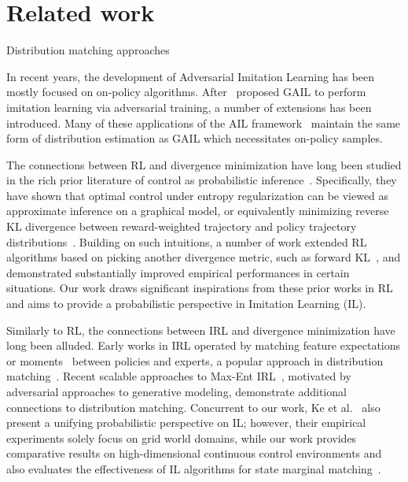 \section{Related work}
Distribution matching approaches 

In recent years, the development of Adversarial Imitation Learning has been mostly focused on on-policy algorithms. 
After~\citet{ho2016generative} proposed GAIL to perform imitation learning via adversarial training, a number of extensions has been introduced. 
Many of these applications of the AIL framework~\citep{li2017infogail,hausman2017multi,sun2019adversarial} maintain the same form of distribution estimation as GAIL which necessitates on-policy samples. 


The connections between RL and divergence minimization have long been studied in the rich prior literature of control as probabilistic inference~\citep{todorov2007linearly,toussaint2009robot,peters2010relative,kappen2012optimal}. 
Specifically, they have shown that optimal control under entropy regularization can be viewed as approximate inference on a graphical model, or equivalently minimizing reverse KL divergence between reward-weighted trajectory and policy trajectory distributions~\citep{kappen2012optimal,levine2018reinforcement}.
Building on such intuitions, a number of work extended RL algorithms based on picking another divergence metric, such as forward KL~\citep{peters2007reinforcement,norouzi2016reward}, and demonstrated substantially improved empirical performances in certain situations. 
Our work draws significant inspirations from these prior works in RL and aims to provide a probabilistic perspective in Imitation Learning (IL).


Similarly to RL, the connections between IRL and divergence minimization have long been alluded. 
Early works in IRL operated by matching feature expectations or moments~\citep{abbeel2004apprenticeship} between policies and experts, a popular approach in distribution matching~\citep{dziugaite2015training,li2015generative}.
Recent scalable approaches to Max-Ent IRL~\citep{ho2016generative}, motivated by adversarial approaches to generative modeling, demonstrate additional connections to distribution matching. 
Concurrent to our work, Ke et al.~\citep{ke2019imitation} also present a unifying probabilistic perspective on IL; 
however, their empirical experiments solely focus on grid world domains, while our work provides comparative results on high-dimensional continuous control environments and also evaluates the effectiveness of IL algorithms for state marginal matching~\citep{lee2019efficient}.
